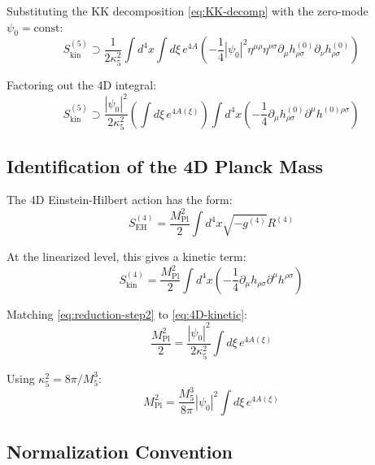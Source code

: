 \documentclass[11pt,a4paper]{article}
\newcommand{\Mpl}{M_{\mathrm{Pl}}}
\newcommand{\Mfive}{M_5}
\newcommand{\kfive}{\kappa_5}
\begin{document}
Substituting the KK decomposition \eqref{eq:KK-decomp} with the zero-mode
$\psi_0 = \mathrm{const}$:
\begin{equation}
S_{\mathrm{kin}}^{(5)} \supset \frac{1}{2\kfive^2} \int d^4x \int d\xi\, e^{4A}
\left( -\frac{1}{4} |\psi_0|^2 \eta^{\mu\rho}\eta^{\nu\sigma}
\partial_\mu h_{\rho\sigma}^{(0)} \partial_\nu h^{(0)}_{\rho\sigma} \right)
\label{eq:reduction-step1}
\end{equation}

Factoring out the 4D integral:
\begin{equation}
S_{\mathrm{kin}}^{(5)} \supset \frac{|\psi_0|^2}{2\kfive^2}
\left( \int d\xi\, e^{4A(\xi)} \right)
\int d^4x \left( -\frac{1}{4} \partial_\mu h^{(0)}_{\rho\sigma}
\partial^\mu h^{(0)\rho\sigma} \right)
\label{eq:reduction-step2}
\end{equation}

\subsection{Identification of the 4D Planck Mass}

The 4D Einstein-Hilbert action has the form:
\begin{equation}
S_{\mathrm{EH}}^{(4)} = \frac{\Mpl^2}{2} \int d^4x \sqrt{-g^{(4)}} R^{(4)}
\label{eq:4D-EH}
\end{equation}

At the linearized level, this gives a kinetic term:
\begin{equation}
S_{\mathrm{kin}}^{(4)} = \frac{\Mpl^2}{2} \int d^4x
\left( -\frac{1}{4} \partial_\mu h_{\rho\sigma} \partial^\mu h^{\rho\sigma} \right)
\label{eq:4D-kinetic}
\end{equation}

Matching \eqref{eq:reduction-step2} to \eqref{eq:4D-kinetic}:
\begin{equation}
\frac{\Mpl^2}{2} = \frac{|\psi_0|^2}{2\kfive^2} \int d\xi\, e^{4A(\xi)}
\label{eq:matching-step}
\end{equation}

Using $\kfive^2 = 8\pi/\Mfive^3$:
\begin{equation}
\Mpl^2 = \frac{\Mfive^3}{8\pi} |\psi_0|^2 \int d\xi\, e^{4A(\xi)}
\label{eq:Mpl-almost}
\end{equation}

\subsection{Normalization Convention}
\end{document}
